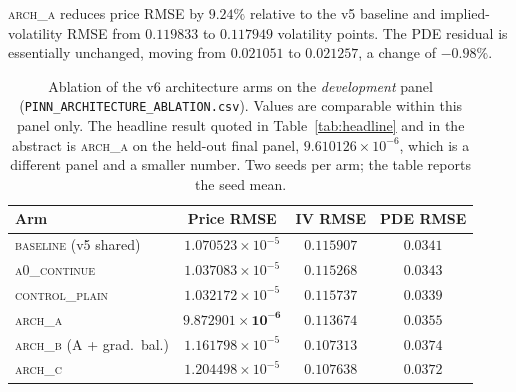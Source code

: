 \documentclass[conference]{IEEEtran}
\begin{document}

\textsc{arch\_a} reduces price RMSE by $9.24\%$ relative to the v5 baseline
and implied-volatility RMSE from $0.119833$ to $0.117949$ volatility points.
The PDE residual is essentially unchanged, moving from $0.021051$ to
$0.021257$, a change of $-0.98\%$.

\begin{table}[t]
\centering
\caption{Ablation of the v6 architecture arms on the \emph{development} panel
(\texttt{PINN\_ARCHITECTURE\_ABLATION.csv}). Values are comparable within this
panel only. The headline result quoted in Table~\ref{tab:headline} and in the
abstract is \textsc{arch\_a} on the held-out final panel,
$9.610126\times10^{-6}$, which is a different panel and a smaller number.
Two seeds per arm; the table reports the seed mean.}
\label{tab:ablation}
\begin{tabular}{lccc}
\toprule
Arm & Price RMSE & IV RMSE & PDE RMSE \\
\midrule
\textsc{baseline} (v5 shared)           & $1.070523\times10^{-5}$ & $0.115907$ & $0.0341$ \\
\textsc{a0\_continue}                   & $1.037083\times10^{-5}$ & $0.115268$ & $0.0343$ \\
\textsc{control\_plain}                 & $1.032172\times10^{-5}$ & $0.115737$ & $0.0339$ \\
\textsc{arch\_a}                        & $\mathbf{9.872901\times10^{-6}}$ & $0.113674$ & $0.0355$ \\
\textsc{arch\_b} (A + grad.\ bal.)      & $1.161798\times10^{-5}$ & $\mathbf{0.107313}$ & $0.0374$ \\
\textsc{arch\_c}                        & $1.204498\times10^{-5}$ & $0.107638$ & $0.0372$ \\
\bottomrule
\end{tabular}
\end{table}
\end{document}
